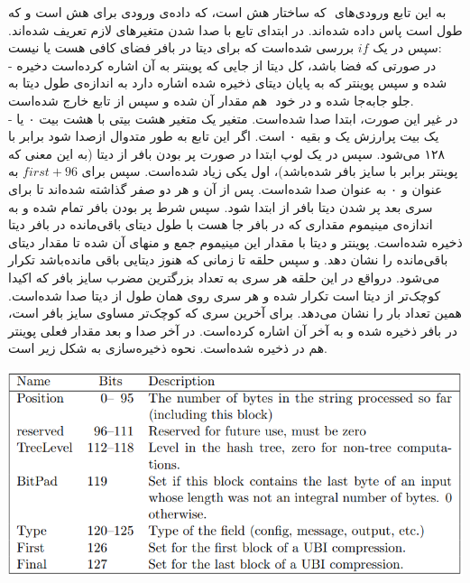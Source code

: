 به این تابع ورودی‌های ‌ که  ساختار هش است،  که داده‌ی ورودی برای هش است و  که طول  است پاس داده شده‌اند. در ابتدای تابع با صدا شدن \hyperref[subsec:DECL-STATE-BIG]{} متغیرهای لازم تعریف شده‌اند. سپس در یک $ if $ بررسی شده‌است که برای دیتا در بافر فضای کافی هست یا نیست: \\
- در صورتی که فضا باشد،‌ کل دیتا از جایی که پوینتر به آن اشاره کرده‌است دخیره شده‌ و سپس پوینتر که به پایان دیتای ذخیره شده اشاره دارد به اندازه‌ی طول دیتا به جلو جابه‌جا شده‌ و در خود ‌ هم مقدار ‌آن  شده‌ و سپس از تابع خارج شده‌است.
\\
- در غیر این صورت، ابتدا  \hyperref[subsec:READ-STATE-BIG]{} صدا شده‌است. متغیر  یک متغیر هشت بیتی با هشت بیت ۰ یا یک بیت پرارزش یک و بقیه ۰ است. اگر این تابع به طور متدوال از\hyperref[subsec:skein-hash]{}صدا شود  برابر با ۱۲۸ می‌شود. سپس در یک لوپ ابتدا در صورت پر بودن بافر از دیتا (به این معنی که پوینتر برابر با سایز بافر شده‌باشد)،‌ اول   یکی زیاد شده‌است. سپس\hyperref[subsec:UBI-BIG]{} برای $ first + 96 $ به عنوان  و ۰ به عنوان  صدا شده‌است. پس از آن  و  هر دو صفر گذاشته شده‌اند تا برای سری بعد پر شدن دیتا بافر از ابتدا  شود. سپس شرط پر بودن بافر تمام شده و به اندازه‌ی مینیموم مقداری که در بافر جا هست با طول دیتای باقی‌مانده در بافر دیتا ذخیره شده‌است. پوینتر و دیتا با مقدار این مینیموم جمع و  منهای آن شده‌ تا مقدار دیتای باقی‌مانده را نشان دهد. و سپس حلقه تا زمانی که هنوز دیتایی باقی مانده‌باشد تکرار می‌شود. درواقع در این حلقه هر سری به تعداد بزرگترین مضرب سایز بافر که اکیدا کوچک‌تر از  دیتا است تکرار شده و هر سری روی همان طول از دیتا \hyperref[subsec:UBI-BIG]{} صدا شده‌است.  همین تعداد بار را نشان می‌دهد. برای آخرین سری که کوچک‌تر مساوی سایز بافر است، در بافر ذخیره شده و  به آخر آن اشاره کرده‌است. 
در آخر \hyperref[subsec:WRITE-STATE-BIG]{}
صدا و بعد مقدار فعلی پوینتر هم در  ذخیره شده‌است. 
نحوه ذخیره‌سازی  به شکل زیر است. 
\begin{center}
	\includegraphics[width=14cm]{images/tweak.png}
\end{center}

